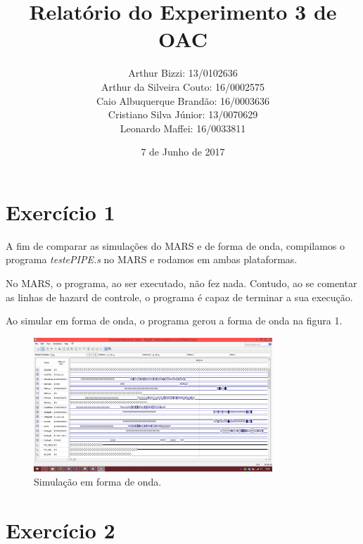 \documentclass[12pt, a4paper, twoside]{article}
\begin{document}
\title{Relatório do Experimento 3 de OAC}
\author{
Arthur Bizzi: 13/0102636 \\
Arthur da Silveira Couto: 16/0002575 \\
Caio Albuquerque Brandão: 16/0003636 \\
Cristiano Silva Júnior: 13/0070629 \\
Leonardo Maffei: 16/0033811 \\}
\date{7 de Junho de 2017}
\maketitle

\section{Exercício 1}

A fim de comparar as simulações do MARS e de forma de onda, compilamos o programa \textit{testePIPE.s} no MARS e rodamos em ambas plataformas.

No MARS, o programa, ao ser executado, não fez nada. Contudo, ao se comentar as linhas de hazard de controle, o programa é capaz de terminar a sua execução.

Ao simular em forma de onda, o programa gerou a forma de onda na figura 1.

\begin{figure}
    \centering
    \includegraphics[width=0.8\textwidth]{./figs/sim1.png}
    \caption{Simulação em forma de onda.}
\end{figure}

\section{Exercício 2}

\end{document}
